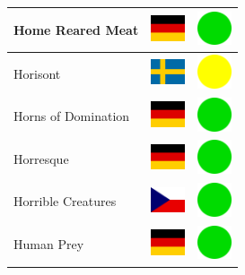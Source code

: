 \documentclass[12pt, a4paper, twoside]{report}
\begin{document}
\begin{center}
\begin{longtable}{|p{5cm}|p{2cm}|p{2cm}|}
 Home Reared Meat                                           & \includegraphics[width=1cm]{../4x3/de} &   \includegraphics[width=1cm]{../likes/y} \\ \hline
 Horisont                                                   & \includegraphics[width=1cm]{../4x3/se} &   \includegraphics[width=1cm]{../likes/m} \\ \hline
 Horns of Domination                                        & \includegraphics[width=1cm]{../4x3/de} &   \includegraphics[width=1cm]{../likes/y} \\ \hline
 Horresque                                                  & \includegraphics[width=1cm]{../4x3/de} &   \includegraphics[width=1cm]{../likes/y} \\ \hline
 Horrible Creatures                                         & \includegraphics[width=1cm]{../4x3/cz} &   \includegraphics[width=1cm]{../likes/y} \\ \hline
 Human Prey                                                 & \includegraphics[width=1cm]{../4x3/de} &   \includegraphics[width=1cm]{../likes/y} \\ \hline

\end{longtable}
\end{center}
\end{document}
